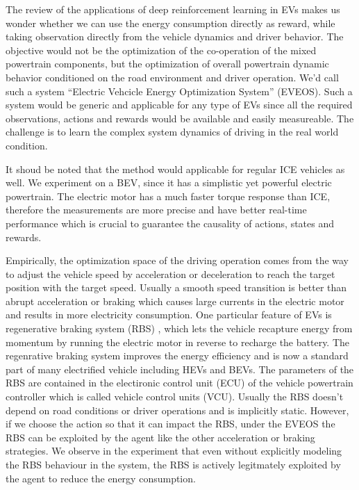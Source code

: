 \documentclass{article}
\begin{document}
The review of the applications of deep reinforcement learning in EVs makes us wonder whether we can use the energy consumption directly as reward, while taking observation directly from the vehicle dynamics and driver behavior. The objective would not be the optimization of the co-operation of the mixed powertrain components, but the optimization of overall powertrain dynamic behavior conditioned on the road environment and driver operation. We'd call such a system ``Electric Vehcicle Energy Optimization System'' (EVEOS). Such a system would be generic and applicable for any type of EVs since all the required observations, actions and rewards would be available and easily measureable. The challenge is to learn the complex system dynamics of driving in the real world condition.

It shoud be noted that the method would applicable for regular ICE vehicles as well. We experiment on a BEV, since it has a simplistic yet powerful electric powertrain. The electric motor has a much faster torque response than ICE, therefore the measurements are more precise and have better real-time performance which is crucial to guarantee the causality of actions, states and rewards.

Empirically, the optimization space of the driving operation comes from the way to adjust the vehicle speed by acceleration or deceleration to reach the target position with the target speed. Usually a smooth speed transition is better than abrupt acceleration or braking which causes large currents in the electric motor and results in more electricity consumption. One particular feature of EVs is regenerative braking system (RBS) \parencite{enwiki:1228286642}, which lets the vehicle recapture energy from momentum by running the electric motor in reverse to recharge the battery. The regenrative braking system improves the energy efficiency and is now a standard part of many electrified vehicle including HEVs and BEVs. The parameters of the RBS are contained in the electironic control unit (ECU) of the vehicle powertrain controller which is called vehicle control units (VCU). Usually the RBS doesn't depend on road conditions or driver operations and is implicitly static. However, if we choose the action so that it can impact the RBS, under the EVEOS the RBS can be exploited by the agent like the other acceleration or braking strategies. We observe in the experiment that even without explicitly modeling the RBS behaviour in the system, the RBS is actively legitmately exploited by the agent to reduce the energy consumption.
\end{document}
